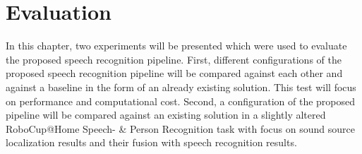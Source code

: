 

\chapter{Evaluation}

In this chapter, two experiments will be presented which were used to evaluate the proposed speech recognition pipeline.
First, different configurations of the proposed speech recognition pipeline will be compared against each other and against a baseline in the form of an already existing solution.
This test will focus on performance and computational cost.
Second, a configuration of the proposed pipeline will be compared against an existing solution in a slightly altered RoboCup@Home Speech- \& Person Recognition task with focus on sound source localization results and their fusion with speech recognition results.



\newpage
